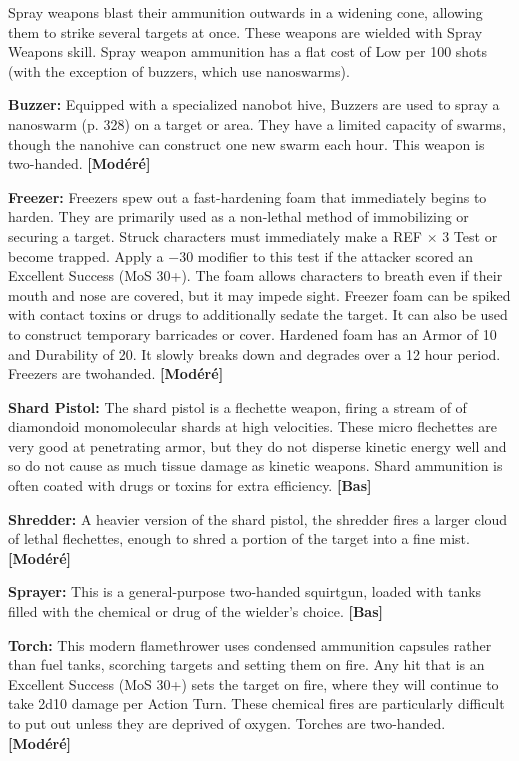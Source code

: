 {{Spray weapons blast their ammunition outwards in a widening cone, allowing them to strike several targets at once. These weapons are wielded with Spray Weapons skill. Spray weapon ammunition has a flat cost of Low per 100 shots (with the exception of buzzers, which use nanoswarms). 

\textbf{Buzzer:} Equipped with a specialized nanobot hive, Buzzers are used to spray a nanoswarm (p. 328) on a target or area. They have a limited capacity of swarms, though the nanohive can construct one new swarm each hour. This weapon is two-handed. \textbf{[Modéré]} 

\textbf{Freezer:} Freezers spew out a fast-hardening foam that immediately begins to harden. They are primarily used as a non-lethal method of immobilizing or securing a target. Struck characters must immediately make a REF $\times$ 3 Test or become trapped. Apply a $-$30 modifier to this test if the attacker scored an Excellent Success (MoS 30+). The foam allows characters to breath even if their mouth and nose are covered, but it may impede sight. Freezer foam can be spiked with contact toxins or drugs to additionally sedate the target. It can also be used to construct temporary barricades or cover. Hardened foam has an Armor of 10 and Durability of 20. It slowly breaks down and degrades over a 12 hour period. Freezers are twohanded. \textbf{[Modéré]} 

\textbf{Shard Pistol:} The shard pistol is a flechette weapon, firing a stream of of diamondoid monomolecular shards at high velocities. These micro flechettes are very good at penetrating armor, but they do not disperse kinetic energy well and so do not cause as much tissue damage as kinetic weapons. Shard ammunition is often coated with drugs or toxins for extra efficiency. \textbf{[Bas]} 

\textbf{Shredder:} A heavier version of the shard pistol, the shredder fires a larger cloud of lethal flechettes, enough to shred a portion of the target into a fine mist. \textbf{[Modéré]} 

\textbf{Sprayer:} This is a general-purpose two-handed squirtgun, loaded with tanks filled with the chemical or drug of the wielder’s choice. \textbf{[Bas]} 

\textbf{Torch:} This modern flamethrower uses condensed ammunition capsules rather than fuel tanks, scorching targets and setting them on fire. Any hit that is an Excellent Success (MoS 30+) sets the target on fire, where they will continue to take 2d10 damage per Action Turn. These chemical fires are particularly difficult to put out unless they are deprived of oxygen. Torches are two-handed. \textbf{[Modéré]} 

}}
